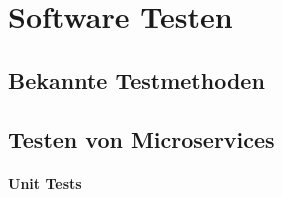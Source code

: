 \documentclass[12pt,a4paper,bibliography=totocnumbered,listof=totocnumbered]{scrartcl}
\begin{document}
\section{Software Testen}

\subsection{Bekannte Testmethoden}\label{ch:soft-test}

\subsection{Testen von Microservices}\label{ch:ms-test}
\label{sec:testingms}

\paragraph{Unit Tests}
\end{document}
